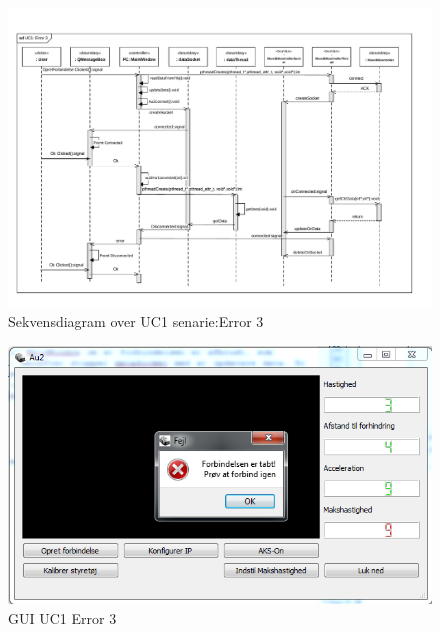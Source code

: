 \begin{figure}[H]
\centering
\includegraphics[width=\textwidth* 1,height=\textwidth* 7/10 ]{../fig/diagrammer/pc/sd_uc1_Error_3.pdf}
\caption{Sekvensdiagram over UC1 senarie:Error 3}
\label{fig:cd_uc1_error_3}
\end{figure}

\begin{figure}[H]
\centering
\includegraphics[width=\textwidth* 3/4,height=\textwidth* 9/20 ]{../fig/billeder/gui_uc1_error_3.png}
\caption{GUI UC1 Error 3}
\label{fig:GUI_uc1_error_3}
\end{figure}


